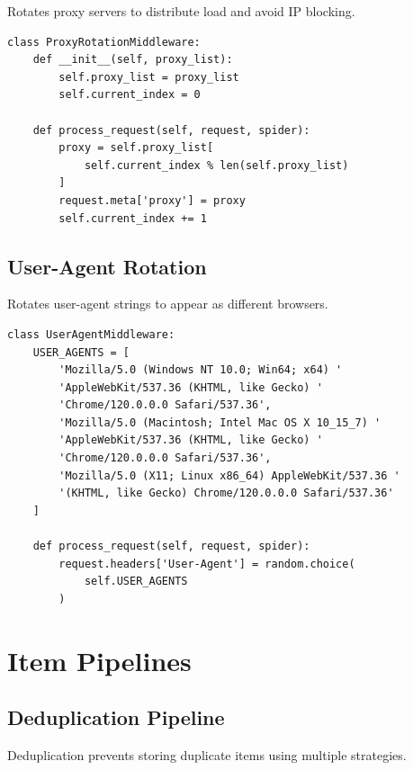 \documentclass[12pt,a4paper]{report}
\begin{document}
Rotates proxy servers to distribute load and avoid IP blocking.

\begin{lstlisting}
class ProxyRotationMiddleware:
    def __init__(self, proxy_list):
        self.proxy_list = proxy_list
        self.current_index = 0
    
    def process_request(self, request, spider):
        proxy = self.proxy_list[
            self.current_index % len(self.proxy_list)
        ]
        request.meta['proxy'] = proxy
        self.current_index += 1
\end{lstlisting}

\subsection{User-Agent Rotation}

Rotates user-agent strings to appear as different browsers.

\begin{lstlisting}
class UserAgentMiddleware:
    USER_AGENTS = [
        'Mozilla/5.0 (Windows NT 10.0; Win64; x64) '
        'AppleWebKit/537.36 (KHTML, like Gecko) '
        'Chrome/120.0.0.0 Safari/537.36',
        'Mozilla/5.0 (Macintosh; Intel Mac OS X 10_15_7) '
        'AppleWebKit/537.36 (KHTML, like Gecko) '
        'Chrome/120.0.0.0 Safari/537.36',
        'Mozilla/5.0 (X11; Linux x86_64) AppleWebKit/537.36 '
        '(KHTML, like Gecko) Chrome/120.0.0.0 Safari/537.36'
    ]
    
    def process_request(self, request, spider):
        request.headers['User-Agent'] = random.choice(
            self.USER_AGENTS
        )
\end{lstlisting}

\section{Item Pipelines}

\subsection{Deduplication Pipeline}

Deduplication prevents storing duplicate items using multiple strategies.
\end{document}
